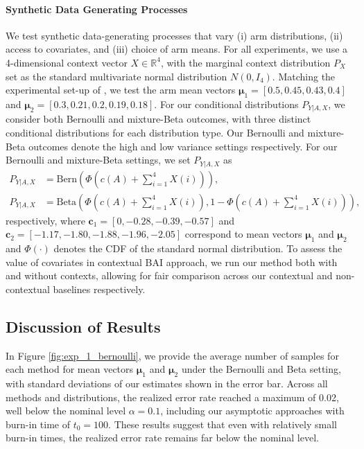\documentclass{article}
\begin{document}
\paragraph{Synthetic Data Generating Processes} We test synthetic data-generating processes that vary (i) arm distributions, (ii) access to covariates, and (iii) choice of arm means. For all experiments, we use a 4-dimensional context vector $X \in \mathbb{R}^4$, with the marginal context distribution $P_X$ set as the standard multivariate normal distribution $N(0, I_4)$. Matching the experimental set-up of \cite{garivier2016optimalbestarmidentification}, we test the arm mean vectors $\bm{\mu}_1 = [0.5, 0.45, 0.43, 0.4]$ and $\bm{\mu}_2 = [0.3, 0.21, 0.2, 0.19, 0.18]$. For our conditional distributions $P_{Y|A,X}$, we consider both Bernoulli and mixture-Beta outcomes, with three distinct conditional distributions for each distribution type. Our Bernoulli and mixture-Beta outcomes denote the high and low variance settings respectively. For our Bernoulli and mixture-Beta settings, we set $P_{Y|A,X}$ as
\begin{align}
    P_{Y|A,X} &= \text{Bern}\left(\Phi\left(c(A) + \sum_{i=1}^4 X(i)\right)  \right), \\  P_{Y|A,X} &= \text{Beta}\left( \Phi\left(c(A) + \sum_{i=1}^4 X(i)\right), 1-\Phi\left(c(A) + \sum_{i=1}^4 X(i)\right)\right),
\end{align}
respectively, where $\bm{c}_1 = [0, -0.28, -0.39, -0.57]$ and $\bm{c}_2 = [-1.17, -1.80, -1.88, -1.96, -2.05]$ correspond to mean vectors $\bm{\mu}_1$ and $\bm{\mu}_2$ and $\Phi(\cdot)$ denotes the CDF of the standard normal distribution. To assess the value of covariates in contextual BAI approach, we run our method both with and without contexts, allowing for fair comparison across our contextual and non-contextual baselines respectively. 

\subsection{Discussion of Results}

In Figure \ref{fig:exp_1_bernoulli}, we provide the average number of samples for each method for mean vectors $\bm{\mu}_1$ and $\bm{\mu}_2$ under the Bernoulli and Beta setting, with standard deviations of our estimates shown in the error bar. Across all methods and distributions, the realized error rate reached a maximum of 0.02, well below the nominal level $\alpha = 0.1$, including our asymptotic approaches with burn-in time of $t_0=100$. These results suggest that even with relatively small burn-in times, the realized error rate remains far below the nominal level. 
\end{document}
